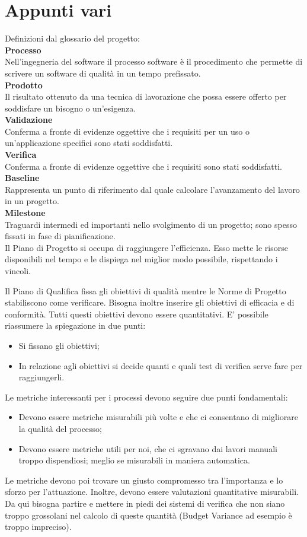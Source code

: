\section{Appunti vari}

Definizioni dal glossario del progetto:\\
\textbf{Processo}\\
Nell'ingegneria del software il processo software è il procedimento che permette di
scrivere un software di qualità in un tempo prefissato.\\
\textbf{Prodotto}\\
Il risultato ottenuto da una tecnica di lavorazione che possa essere offerto per
soddisfare un bisogno o un'esigenza.\\
\textbf{Validazione}\\
Conferma a fronte di evidenze oggettive che i requisiti per un uso o un'applicazione
specifici sono stati soddisfatti.\\
\textbf{Verifica}\\
Conferma a fronte di evidenze oggettive che i requisiti sono stati soddisfatti.\\
\textbf{Baseline}\\
Rappresenta un punto di riferimento dal quale calcolare l’avanzamento del lavoro
in un progetto.\\
\textbf{Milestone}\\
Traguardi intermedi ed importanti nello svolgimento di un progetto; sono spesso
fissati in fase di pianificazione.\\


Il Piano di Progetto si occupa di raggiungere l'efficienza. Esso mette le risorse disponibili
nel tempo e le dispiega nel miglior modo possibile, rispettando i vincoli.

Il Piano di Qualifica fissa gli obiettivi di qualità mentre le Norme di Progetto stabiliscono
come verificare. Bisogna inoltre inserire gli obiettivi di efficacia e di
conformità. Tutti questi obiettivi devono essere quantitativi.
E' possibile riassumere la spiegazione in due punti:
\begin{itemize}
\item Si fissano gli obiettivi;
\item In relazione agli obiettivi si decide quanti e quali test di verifica serve fare per raggiungerli.
\end{itemize}

Le metriche interessanti per i processi devono seguire due punti fondamentali:
\begin{itemize}
\item Devono essere metriche misurabili più volte e che ci consentano di migliorare la qualità del processo;
\item Devono essere metriche utili per noi, che ci sgravano dai lavori manuali troppo dispendiosi; meglio se misurabili in maniera automatica. 
\end{itemize}
Le metriche devono poi trovare un giusto compromesso tra l'importanza e lo sforzo per
l'attuazione. Inoltre, devono essere valutazioni quantitative misurabili. Da qui bisogna
partire e mettere in piedi dei sistemi di verifica che non siano troppo grossolani nel
calcolo di queste quantità (Budget Variance ad esempio è troppo impreciso).
